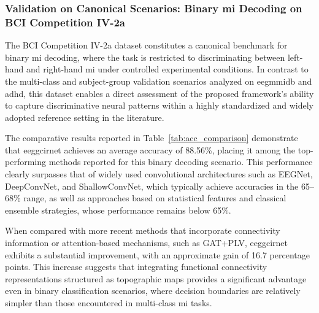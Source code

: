 \subsubsection{Validation on Canonical Scenarios: Binary \gls{mi} Decoding on BCI Competition IV-2a}

The BCI Competition IV-2a dataset constitutes a canonical benchmark for binary \gls{mi} decoding, where the task is restricted to discriminating between left-hand and right-hand \gls{mi} under controlled experimental conditions. In contrast to the multi-class and subject-group validation scenarios analyzed on \gls{eegmmidb} and \gls{adhd}, this dataset enables a direct assessment of the proposed framework’s ability to capture discriminative neural patterns within a highly standardized and widely adopted reference setting in the literature.

The comparative results reported in Table~\ref{tab:acc_comparison} demonstrate that \gls{eeggcirnet} achieves an average accuracy of 88.56\%, placing it among the top-performing methods reported for this binary decoding scenario. This performance clearly surpasses that of widely used convolutional architectures such as EEGNet, DeepConvNet, and ShallowConvNet, which typically achieve accuracies in the 65–68\% range, as well as approaches based on statistical features and classical ensemble strategies, whose performance remains below 65\%.

When compared with more recent methods that incorporate connectivity information or attention-based mechanisms, such as GAT+PLV, \gls{eeggcirnet} exhibits a substantial improvement, with an approximate gain of 16.7 percentage points. This increase suggests that integrating functional connectivity representations structured as topographic maps provides a significant advantage even in binary classification scenarios, where decision boundaries are relatively simpler than those encountered in multi-class \gls{mi} tasks.


